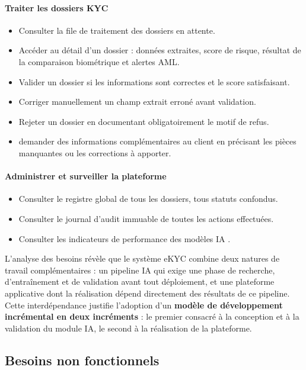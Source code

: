 \paragraph*{Traiter les dossiers KYC}
\begin{itemize}
  \item Consulter la file de traitement des dossiers en attente.
  \item Accéder au détail d'un dossier : données extraites, score de risque, résultat de la comparaison biométrique et alertes AML.
  \item Valider un dossier si les informations sont correctes et le score satisfaisant.
  \item Corriger manuellement un champ extrait erroné avant validation.
  \item Rejeter un dossier en documentant obligatoirement le motif de refus.
  \item demander des informations complémentaires au client en précisant les pièces manquantes ou les corrections à apporter.
\end{itemize}

\paragraph*{Administrer et surveiller la plateforme}
\begin{itemize}
  \item Consulter le registre global de tous les dossiers, tous statuts confondus.
  \item Consulter le journal d'audit immuable de toutes les actions effectuées.
  \item Consulter les indicateurs de performance des modèles IA .
 
\end{itemize}

\bigskip
\noindent L'analyse des besoins révèle que le système eKYC combine deux natures de travail complémentaires : un pipeline IA qui exige une phase de recherche, d'entraînement et de validation avant tout déploiement, et une plateforme applicative dont la réalisation dépend directement des résultats de ce pipeline. Cette interdépendance justifie l'adoption d'un \textbf{modèle de développement incrémental en deux incréments} : le premier consacré à la conception et à la validation du module IA, le second à la réalisation de la plateforme.

\subsection{Besoins non fonctionnels}
\label{subsec:besoins-non-fonctionnels}

